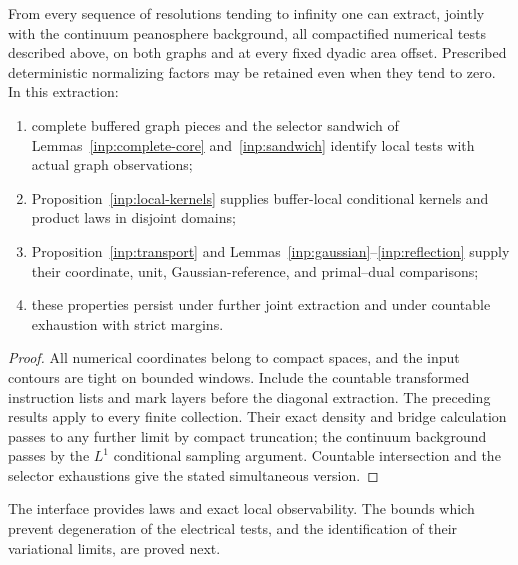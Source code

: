 \begin{proposition}\label{inp:array-interface}
From every sequence of resolutions tending to infinity one can
extract, jointly with the continuum peanosphere background,
all compactified numerical tests described above, on both
graphs and at every fixed dyadic area offset.  Prescribed
deterministic normalizing factors may be retained even when
they tend to zero.  In this extraction:
\begin{enumerate}
\item complete buffered graph pieces and the selector sandwich
of Lemmas~\ref{inp:complete-core} and~\ref{inp:sandwich} identify
local tests with actual graph observations;
\item Proposition~\ref{inp:local-kernels} supplies buffer-local
conditional kernels and product laws in disjoint domains;
\item Proposition~\ref{inp:transport} and
Lemmas~\ref{inp:gaussian}--\ref{inp:reflection} supply their
coordinate, unit, Gaussian-reference, and primal--dual
comparisons;
\item these properties persist under further joint extraction
and under countable exhaustion with strict margins.
\end{enumerate}
\end{proposition}

\begin{proof}
All numerical coordinates belong to compact spaces, and the
input contours are tight on bounded windows.  Include the
countable transformed instruction lists and mark layers before
the diagonal extraction.  The preceding results apply to
every finite collection.  Their exact density and bridge
calculation passes to any further limit by compact truncation;
the continuum background passes by the $L^1$ conditional
sampling argument.  Countable intersection and the selector
exhaustions give the stated simultaneous version.
\end{proof}

The interface provides laws and exact local observability.
The bounds which prevent degeneration of the electrical tests,
and the identification of their variational limits, are proved
next.
